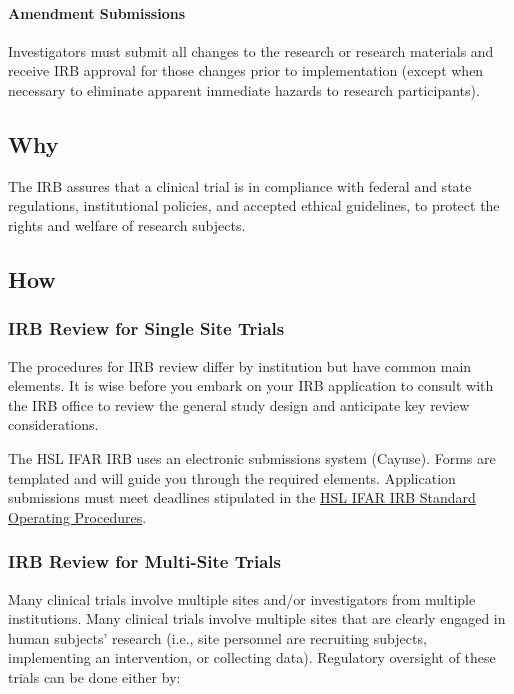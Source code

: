 \documentclass[]{book}
\begin{document}
\paragraph{Amendment Submissions}\label{amendment-submissions}

Investigators must submit all changes to the research or research
materials and receive IRB approval for those changes prior to
implementation (except when necessary to eliminate apparent immediate
hazards to research participants).

\subsection{Why}\label{why-5}

The IRB assures that a clinical trial is in compliance with federal and
state regulations, institutional policies, and accepted ethical
guidelines, to protect the rights and welfare of research subjects.

\subsection{How}\label{how-5}

\subsubsection{IRB Review for Single Site
Trials}\label{irb-review-for-single-site-trials}

The procedures for IRB review differ by institution but have common main
elements. It is wise before you embark on your IRB application to
consult with the IRB office to review the general study design and
anticipate key review considerations.

The HSL IFAR IRB uses an electronic submissions system (Cayuse). Forms
are templated and will guide you through the required elements.
Application submissions must meet deadlines stipulated in the
\href{http://thehslhub/~/media/HSLNet/Docs/IFAR/IRB/IRB_SOP.ashx}{HSL
IFAR IRB Standard Operating Procedures}.

\subsubsection{IRB Review for Multi-Site
Trials}\label{irb-review-for-multi-site-trials}

Many clinical trials involve multiple sites and/or investigators from
multiple institutions. Many clinical trials involve multiple sites that
are clearly engaged in human subjects' research (i.e., site personnel
are recruiting subjects, implementing an intervention, or collecting
data). Regulatory oversight of these trials can be done either by:
\end{document}
